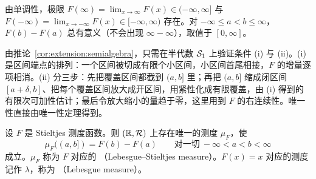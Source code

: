 由单调性，极限 $F(\infty)=\lim_{x\to\infty}F(x)\in(-\infty,\infty]$ 与 $F(-\infty)=\lim_{x\to-\infty}F(x)\in[-\infty,\infty)$ 存在。对 $-\infty\leqslant a<b\leqslant\infty$，$F(b)-F(a)$ 总有意义（不会出现 $\infty-\infty$），取值于 $[0,\infty]$。

\begin{remark}[证明思路]
由推论~\ref{cor:extension:semialgebra}，只需在半代数 $\mathcal{S}_1$ 上验证条件 (i) 与 (ii)。(i) 是区间端点的排列：一个区间被切成有限个小区间，小区间首尾相接，$F$ 的增量逐项相消。(ii) 分三步：先把覆盖区间都截到 $(a,b]$ 里；再把 $(a,b]$ 缩成闭区间 $[a+\delta,b]$、把每个覆盖区间放大成开区间，用紧性化成有限覆盖，由 (i) 得到的有限次可加性估计；最后令放大缩小的量趋于零，这里用到 $F$ 的右连续性。唯一性直接由唯一性定理得到。
\end{remark}

\begin{theorem}\label{thm:extension:lebesgue-stieltjes}
设 $F$ 是 Stieltjes 测度函数。则 $(\mathbb{R},\mathcal{R})$ 上存在唯一的测度 $\mu_F$，使
\[
\mu_F((a,b])=F(b)-F(a)\qquad\text{对一切}\ -\infty<a<b<\infty
\]
成立。$\mu_F$ 称为 $F$ 对应的 （Lebesgue--Stieltjes measure）。$F(x)=x$ 对应的测度记作 $\lambda$，称为 （Lebesgue measure）。
\end{theorem}
